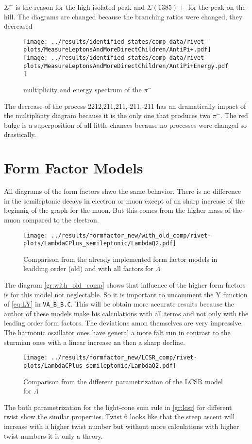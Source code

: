 \(\Sigma^+\) is the reason for the high isolated peak and \(\Sigma(1385)+\) for 
the peak on the hill. The diagrams are changed because the branching ratios 
were changed, they decreased
\begin{figure}[h]
  \centering
  \texttt{[image: ../results/identified\_states/comp\_data/rivet-plots/MeasureLeptonsAndMoreDirectChildren/AntiPi+.pdf]}
  \texttt{[image: ../results/identified\_states/comp\_data/rivet-plots/MeasureLeptonsAndMoreDirectChildren/AntiPi+Energy.pdf]}
  \caption{multiplicity and energy spectrum of the \(\pi^-\)} \label{gr:prim-pi}
\end{figure}
The decrease of the process 2212,211,211,-211,-211 has an dramatically impact 
of the multiplicity diagram because it is the only one that produces two \(\pi^-\).
The red bulge is a superposition of all little chances because no processes were 
changed so drastically.

\clearpage
\section{Form Factor Models}
All diagrams of the form factors shwo the same behavior. There is no difference 
in the semileptonic decays in electron or muon except of an sharp increase of 
the beginnig of the graph for the muon. But this comes from the higher 
mass of the muon compared to the electron.

\begin{figure}[h]
  \centering
  \texttt{[image: ../results/formfactor\_new/with\_old\_comp/rivet-plots/LambdaCPlus\_semileptonic/LambdaQ2.pdf]}
  \caption{Comparison from the already implemented form factor models in leadding order (old)
  and with all factors for \(\Lambda\)} \label{gr:with_old_comp}
\end{figure}

The diagram {\eqref{gr:with_old_comp}} shows that influence of the higher form 
factors is for this model not neglectable. So it is important to uncomment 
the Y function of {\eqref{eq:LY}} in \texttt{VA\_B\_B.C}. This will be obtain 
more accurate results because the author of these models make his calculations 
with all terms and not only with the leading order form factors. The deviations 
amon themselves are very impressive. The harmonic oszillator ones have general 
a more falt run in contrast to the sturmian ones with a linear increase an then 
a sharp decline.

\begin{figure}[h]
  \centering
  \texttt{[image: ../results/formfactor\_new/LCSR\_comp/rivet-plots/LambdaCPlus\_semileptonic/LambdaQ2.pdf]}
  \caption{Comparison from the different parametrization of the LCSR model for \(\Lambda\)} \label{gr:lcsr}
\end{figure}
The both parametrization for the light-cone sum rule in {\eqref{gr:lcsr}} for 
different twist show the similar properties. Twist 6 looks like that the steep 
ascent will increase with a higher twist number but without more calculations 
with higher twist numbers it is only a theory.

